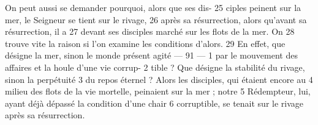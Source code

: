 On peut aussi se demander pourquoi, alors que ses dis-	 
25	 	ciples peinent sur la mer, le Seigneur se tient sur le rivage,	 
26	 	après sa résurrection, alors qu'avant sa résurrection, il a	 
27	 	devant ses disciples marché sur les flots de la mer. On	 
28	 	trouve vite la raison si l'on examine les conditions d'alors.	 
29	 	En effet, que désigne la mer, sinon le monde présent agité	 
 	--- 91 ---	 
1	 	par le mouvement des affaires et la houle d'une vie corrup-	 
2	 	tible ? Que désigne la stabilité du rivage, sinon la perpétuité	 
3	 	du repos éternel ? Alors les disciples, qui étaient encore au	 
4	 	milieu des flots de la vie mortelle, peinaient sur la mer ; notre	 
5	 	Rédempteur, lui, ayant déjà dépassé la condition d'une chair	 
6	 	corruptible, se tenait sur le rivage après sa résurrection.